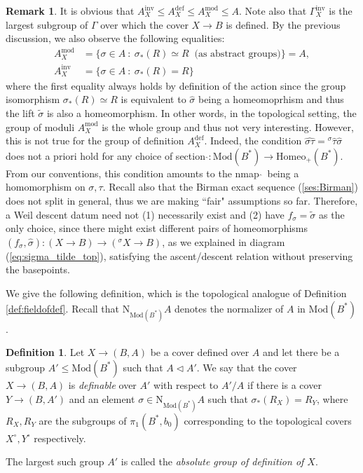 \documentclass[10pt]{amsart}
\theoremstyle{definition}
\newtheorem{remark}[theorem]{Remark}
\newtheorem{definition}[theorem]{Definition}
\begin{document}
\begin{remark}
It is obvious that $A^{\mathrm{inv}}_X \leq A_X^{\mathrm{def}}\leq A^{\mathrm{mod}}_X \leq A$. Note also that $\mathfrak{\Gamma}^{\mathrm{inv}}_X$ is the largest subgroup of $\mathfrak{\Gamma}$ over which the cover $X\to B$ is defined. By the previous discussion, we also observe the following equalities:
\begin{align*}
    A^{\mathrm{mod}}_X &= \{ \sigma \in A \  : \ \sigma_*(R) \simeq R \  \textrm{ (as abstract groups)}\} = A , \\
    A^{\mathrm{inv}}_X &= \{ \sigma \in A \ : \  \sigma_*(R) = R \}    
\end{align*}
where the first equality always holds by definition of the action since the group isomorphism $\sigma_*(R) \simeq R$ is equivalent to $\hat{\sigma}$ being a homeomoprhism and thus the lift $\tilde{\sigma}$ is also a homeomorphism. In other words, in the topological setting, the group of moduli $A^{\mathrm{mod}}_X$ is the whole group and thus not very interesting. 
However, this is not true for the group of definition $A_X^{\mathrm{def}}$. Indeed, the condition $\widehat{\sigma \tau} =  {^\sigma \! \hat{\tau}} \hat{\sigma}$ does not a priori hold for any choice of section $ \hat{} : \mathrm{Mod}(B^*) \rightarrow \mathrm{Homeo}_+(B^*)$. From our conventions, this condition amounts to the nmap $\hat{}$\ being a homomorphism on $\sigma,\tau$. Recall also that the Birman exact sequence (\ref{ses:Birman}) does not split in general, thus we are making “fair" assumptions so far. Therefore, a Weil descent datum need not (1) necessarily exist and (2) have $f_\sigma = \tilde{\sigma}$ as the only choice, since there might exist different pairs of homeomorphisms $(f_\sigma, \hat{\sigma} ) \colon (X \to B) \to ({^\sigma\! X} \to B)$, as we explained in diagram (\ref{eq:sigma_tilde_top}), satisfying the ascent/descent relation without preserving the basepoints.
\end{remark}



We give the following definition, which is the topological analogue of Definition \ref{def:fieldofdef}. Recall that $\mathrm{N}_{\mathrm{Mod}(B^*)}A$ denotes the normalizer of $A$ in $\mathrm{Mod}(B^*)$.

\begin{definition}\label{def:definable_top}
    Let $X \to (B,A)$ be a cover defined over $A$ and let there be a subgroup $A' \leq \mathrm{Mod}(B^*)$ such that $A \lhd A'$. We say that the cover $X \to (B,A)$ is {\em definable} over $A'$ with respect to $A'/A$ if there is a cover $Y \to (B,A')$ and an element $\sigma \in \mathrm{N}_{\mathrm{Mod}(B^*)}A$ such that $\sigma_*(R_X) = R_Y$, where $R_X,R_Y$ are the subgroups of $\pi_1(B^*,b_0)$ corresponding to the topological covers $X^\circ,Y^\circ$ respectively.


    The largest such group $A'$ is called the {\em absolute group of definition of $X$}. 
\end{definition}
\end{document}
